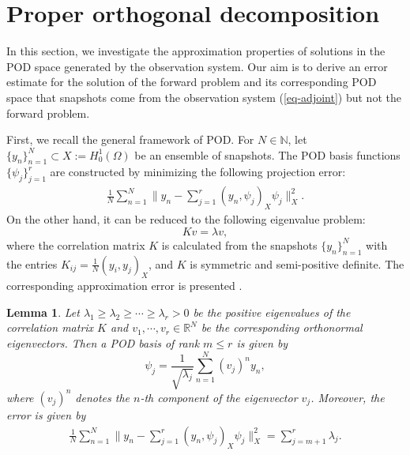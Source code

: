 \documentclass[11pt]{article}
\newtheorem{lemma}{Lemma}[section]
\numberwithin{equation}{section}
\begin{document}
\section{Proper orthogonal decomposition}\label{sec-POD}
In this section, we investigate the approximation properties of solutions in the POD space generated by the observation system.
Our aim is to derive an error estimate for the solution of the forward problem and its corresponding POD space that snapshots come from the observation system (\ref{eq-adjoint}) but not the forward problem. 

First, we recall the general framework of POD. For $N\in\mathbb{N}$, let $\{y_n\}_{n=1}^N\subset X:=H_0^1(\Omega)$ be an ensemble of snapshots. The POD basis functions $\{\psi_j\}_{j=1}^r$ are constructed by minimizing the following projection error:
\begin{align*}
 \frac{1}{N}\sum_{n=1}^N\|y_n-\sum_{j=1}^r(y_n,\psi_j)_X\psi_j\|_{X}^2.   
\end{align*}
On the other hand, it can be reduced to the following eigenvalue problem:
$$Kv=\lambda v,$$
where the correlation matrix $K$ is calculated from the snapshots $\{y_n\}_{n=1}^N$ with the entries $K_{ij}=\frac{1}{N}(y_i,y_j)_X$, and $K$ is symmetric and semi-positive definite. The corresponding approximation error is presented \cite{Sirovich1987}.

\begin{lemma}
Let $\lambda_1\ge \lambda_2\ge \cdots\ge \lambda_r>0$ be the positive eigenvalues of the correlation matrix $K$ and $v_1,\cdots,v_r\in\mathbb{R}^N$ be the corresponding orthonormal eigenvectors. Then a POD basis of rank $m\le r$ is given by
$$\psi_j=\frac{1}{\sqrt{\lambda_j}}\sum_{n=1}^N(v_j)^ny_n,$$
where $(v_j)^n$ denotes the $n$-th component of the eigenvector $v_j$. Moreover, the error is given by
\begin{align*}
 \frac{1}{N}\sum_{n=1}^N\|y_n-\sum_{j=1}^r(y_n,\psi_j)_X\psi_j\|_{X}^2=\sum_{j=m+1}^r\lambda_j.   
\end{align*}
\end{lemma}
\end{document}
